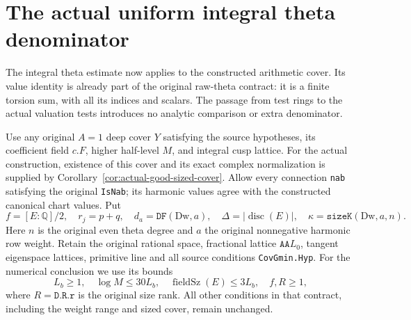 \section{The actual uniform integral theta denominator}
\label{sec:actual-theta-denominator}

The integral theta estimate now applies to the constructed arithmetic
cover.  Its value identity is already part of the original raw-theta
contract: it is a finite torsion sum, with all its indices and scalars.
The passage from test rings to the actual valuation tests introduces
no analytic comparison or extra denominator.

Use any original $A=1$ deep cover $Y$ satisfying the source hypotheses,
its coefficient field $c.F$, higher half-level $M$, and integral cusp
lattice.  For the actual construction, existence of this cover and
its exact complex normalization is supplied by
Corollary~\ref{cor:actual-good-sized-cover}.  Allow every connection
\texttt{nab} satisfying the original \texttt{IsNab}; its harmonic
values agree with the constructed canonical chart values.  Put
\[
 f=[E:\mathbb Q]/2,\quad r_j=p+q,\quad
 d_a=\texttt{DF}(\mathrm{Dw},a),\quad
 \Delta=|\operatorname{disc}(E)|,\quad
 \kappa=\texttt{sizeK}(\mathrm{Dw},a,n).
\]
Here $n$ is the original even theta degree and $a$ the original
nonnegative harmonic row weight.  Retain the original rational space,
fractional lattice $\texttt{AA}L_0$, tangent eigenspace lattices,
primitive line and all source conditions \texttt{CovGmin.Hyp}.
For the numerical conclusion we use its bounds
\[
 L_b\ge1,\quad \log M\le30L_b,\quad
 \operatorname{fieldSz}(E)\le3L_b,\quad f,R\ge1,
\]
where $R=\texttt{D.R.r}$ is the original size rank.  All other
conditions in that contract, including the weight range and sized
cover, remain unchanged.


